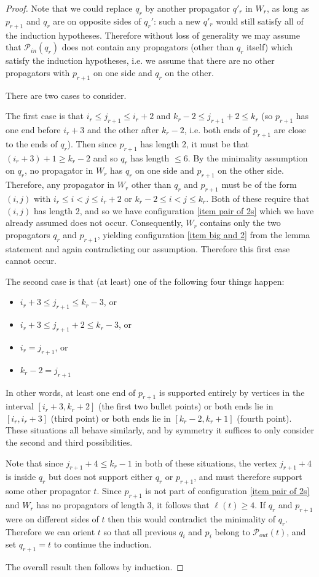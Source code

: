\documentclass[11pt]{article}
\newcommand{\cP}{\mathcal{P}}
\theoremstyle{remark}
\theoremstyle{definition}
\begin{document}
\begin{proof}
Note that we could replace $q_r$ by another propagator $q'_{r}$ in $W_r$, as long as $p_{r+1}$ and $q_r$ are on opposite sides of $q_r'$: such a new $q'_{r}$ would still satisfy all of the induction hypotheses. Therefore without loss of generality we may assume that $\cP_{in}(q_r)$ does not contain any propagators (other than $q_r$ itself) which satisfy the induction hypotheses, i.e. we assume that there are no other propagators with $p_{r+1}$ on one side and $q_r$ on the other.

There are two cases to consider.

The first case is that $i_r \leq j_{r+1} \leq i_r+2$ and $k_r-2 \leq j_{r+1}+2 \leq k_{r}$ (so $p_{r+1}$ has one end before $i_{r} + 3$ and the other after $k_{r} - 2$, i.e. both ends of $p_{r+1}$ are close to the ends of $q_r$).  Then since $p_{r+1}$ has length 2, it must be that $(i_r+3)+1 \geq k_r-2$ and so $q_r$ has length $\leq 6$.  By the minimality assumption on $q_r$, no propagator in $W_r$ has $q_r$ on one side and $p_{r+1}$ on the other side. Therefore, any propagator in $W_r$ other than $q_r$ and $p_{r+1}$ must be of the form $(i,j)$ with $i_r\leq i < j\leq i_r+2$ or $k_r-2 \leq i < j\leq k_r$. Both of these require that $(i,j)$ has length 2, and so we have configuration \ref{item pair of 2s} which we have already assumed does not occur.  Consequently, $W_r$ contains only the two propagators $q_r$ and $p_{r+1}$, yielding configuration \ref{item big and 2} from the lemma statement and again contradicting our assumption. Therefore this first case cannot occur.

The second case is that (at least) one of the following four things happen:
\begin{itemize}
\item $i_r+3 \leq j_{r+1}\leq k_r-3$, or
\item $i_r+3 \leq j_{r+1}+2\leq k_r-3$, or
\item $i_r = j_{r+1}$, or 
\item $k_r-2 = j_{r+1}$
\end{itemize}
In other words, at least one end of $p_{r+1}$ is supported entirely by vertices in the interval $[i_r+3,k_r+2]$ (the first two bullet points) or both ends lie in $[i_r, i_r+3]$ (third point) or both ends lie in $[k_r-2, k_r+1]$ (fourth point). These situations all behave similarly, and by symmetry it suffices to only consider the second and third possibilities. 

Note that since $j_{r+1}+4 \leq k_r-1$ in both of these situations, the vertex $j_{r+1}+4$ is inside $q_r$ but does not support either $q_r$ or $p_{r+1}$, and must therefore support some other propagator $t$.  Since $p_{r+1}$ is not part of configuration \ref{item pair of 2s} and $W_r$ has no propagators of length 3, it follows that $\ell(t) \geq 4$.  If $q_r$ and $p_{r+1}$ were on different sides of $t$ then this would contradict the minimality of $q_r$.  Therefore we can orient $t$ so that all previous $q_i$ and $p_i$ belong to $\cP_{out}(t)$, and set $q_{r+1} = t$ to continue the induction.

The overall result then follows by induction.
\end{proof}
\end{document}
